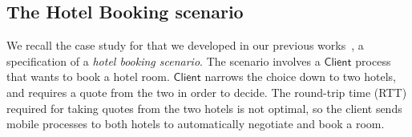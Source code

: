 \documentclass[preprint,11pt]{elsarticle}
\newcommand{\Client}{\mathsf{Client}}
\begin{document}
{%

\subsection{The Hotel Booking scenario}\label{ss:hotel}
We recall the case study for \HOp that we developed in our previous works~\cite{characteristic_bis,KouzapasPY17}, a specification of a \emph{hotel booking scenario}.
The scenario involves a $\Client$ process that wants to book
a hotel room. %
$\Client$
narrows the choice down to two hotels, and requires 
 a quote from the two in order to
decide. The round-trip time (RTT) required for
taking quotes from the two hotels is not optimal, %
so the client sends mobile processes to both hotels
to automatically negotiate and book a room. 


}
\end{document}
